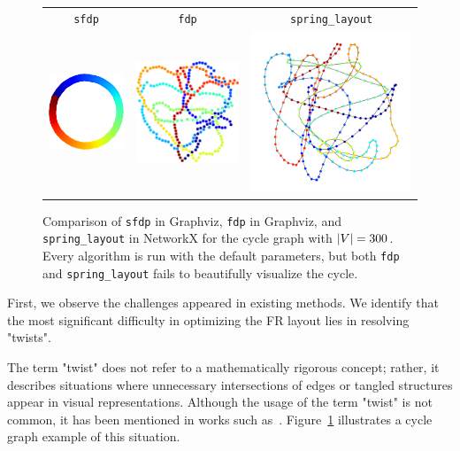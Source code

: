 \documentclass[dvipdfmx,lettersize,journal]{IEEEtran}
\begin{document}
\begin{figure}[t]
  \centering
  \begin{tabular}{ccc}
    \texttt{sfdp}                                                  & \texttt{fdp} & \texttt{spring\_layout} \\
    \includegraphics[width=0.27\columnwidth]{cycle/cycle_sfdp.png} &
    \includegraphics[width=0.27\columnwidth]{cycle/cycle_fdp.png}  &
    \includegraphics[width=0.27\columnwidth]{cycle/cycle_fr.png}                                            \\
  \end{tabular}
  \caption{
    Comparison of \texttt{sfdp} in Graphviz, \texttt{fdp} in Graphviz, and \texttt{spring\_layout} in NetworkX for the cycle graph with $\abs{V} = 300$.
    Every algorithm is run with the default parameters, but both \texttt{fdp} and \texttt{spring\_layout} fails to beautifully visualize the cycle.
  }
  \label{fig:cycle}
\end{figure}

First, we observe the challenges appeared in existing methods.
We identify that the most significant difficulty in optimizing the FR layout lies in resolving "twists".

The term "twist" does not refer to a mathematically rigorous concept; rather, it describes situations where unnecessary intersections of edges or tangled structures appear in visual representations.
Although the usage of the term "twist" is not common, it has been mentioned in works such as~\cite{cheongSnapshotVisualizationComplex2018}. Figure~\ref{fig:cycle} illustrates a cycle graph example of this situation.
\end{document}
